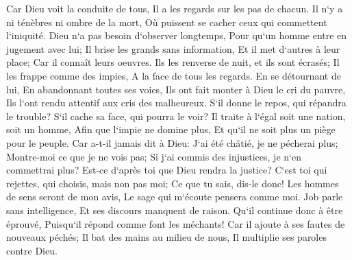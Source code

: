 \verse Car Dieu voit la conduite de tous, Il a les regards sur les pas de chacun. 
\verse Il n`y a ni ténèbres ni ombre de la mort, Où puissent se cacher ceux qui commettent l`iniquité. 
\verse Dieu n`a pas besoin d`observer longtemps, Pour qu`un homme entre en jugement avec lui; 
\verse Il brise les grands sans information, Et il met d`autres à leur place; 
\verse Car il connaît leurs oeuvres. Ils les renverse de nuit, et ils sont écrasés; 
\verse Il les frappe comme des impies, A la face de tous les regards. 
\verse En se détournant de lui, En abandonnant toutes ses voies, 
\verse Ils ont fait monter à Dieu le cri du pauvre, Ils l`ont rendu attentif aux cris des malheureux. 
\verse S`il donne le repos, qui répandra le trouble? S`il cache sa face, qui pourra le voir? Il traite à l`égal soit une nation, soit un homme, 
\verse Afin que l`impie ne domine plus, Et qu`il ne soit plus un piège pour le peuple. 
\verse Car a-t-il jamais dit à Dieu: J`ai été châtié, je ne pécherai plus; 
\verse Montre-moi ce que je ne vois pas; Si j`ai commis des injustices, je n`en commettrai plus? 
\verse Est-ce d`après toi que Dieu rendra la justice? C`est toi qui rejettes, qui choisis, mais non pas moi; Ce que tu sais, dis-le donc! 
\verse Les hommes de sens seront de mon avis, Le sage qui m`écoute pensera comme moi. 
\verse Job parle sans intelligence, Et ses discours manquent de raison. 
\verse Qu`il continue donc à être éprouvé, Puisqu`il répond comme font les méchants! 
\verse Car il ajoute à ses fautes de nouveaux péchés; Il bat des mains au milieu de nous, Il multiplie ses paroles contre Dieu. 

